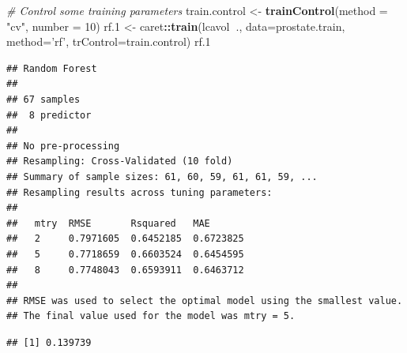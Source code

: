 \documentclass[]{book}
\newenvironment{Shaded}{\begin{snugshade}}{\end{snugshade}}
\newcommand{\CommentTok}[1]{\textcolor[rgb]{0.56,0.35,0.01}{\textit{#1}}}
\newcommand{\DataTypeTok}[1]{\textcolor[rgb]{0.13,0.29,0.53}{#1}}
\newcommand{\DecValTok}[1]{\textcolor[rgb]{0.00,0.00,0.81}{#1}}
\newcommand{\FloatTok}[1]{\textcolor[rgb]{0.00,0.00,0.81}{#1}}
\newcommand{\KeywordTok}[1]{\textcolor[rgb]{0.13,0.29,0.53}{\textbf{#1}}}
\newcommand{\NormalTok}[1]{#1}
\newcommand{\OperatorTok}[1]{\textcolor[rgb]{0.81,0.36,0.00}{\textbf{#1}}}
\newcommand{\StringTok}[1]{\textcolor[rgb]{0.31,0.60,0.02}{#1}}
\theoremstyle{definition}
\theoremstyle{definition}
\theoremstyle{definition}
\theoremstyle{remark}
\begin{document}
\begin{Shaded}
\begin{Highlighting}[]
\CommentTok{# Control some training parameters}
\NormalTok{train.control <-}\StringTok{ }\KeywordTok{trainControl}\NormalTok{(}\DataTypeTok{method =} \StringTok{"cv"}\NormalTok{, }\DataTypeTok{number =} \DecValTok{10}\NormalTok{)}
\NormalTok{rf}\FloatTok{.1}\NormalTok{ <-}\StringTok{ }\NormalTok{caret}\OperatorTok{::}\KeywordTok{train}\NormalTok{(lcavol}\OperatorTok{~}\NormalTok{., }\DataTypeTok{data=}\NormalTok{prostate.train, }
                \DataTypeTok{method=}\StringTok{'rf'}\NormalTok{, }
                \DataTypeTok{trControl=}\NormalTok{train.control)}
\NormalTok{rf}\FloatTok{.1}
\end{Highlighting}
\end{Shaded}

\begin{verbatim}
## Random Forest 
## 
## 67 samples
##  8 predictor
## 
## No pre-processing
## Resampling: Cross-Validated (10 fold) 
## Summary of sample sizes: 61, 60, 59, 61, 61, 59, ... 
## Resampling results across tuning parameters:
## 
##   mtry  RMSE       Rsquared   MAE      
##   2     0.7971605  0.6452185  0.6723825
##   5     0.7718659  0.6603524  0.6454595
##   8     0.7748043  0.6593911  0.6463712
## 
## RMSE was used to select the optimal model using the smallest value.
## The final value used for the model was mtry = 5.
\end{verbatim}

\begin{Shaded}
\end{Shaded}

\begin{verbatim}
## [1] 0.139739
\end{verbatim}

\begin{Shaded}
\end{Shaded}
\end{document}
